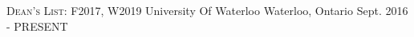 \begin{siderulesEdu}
\begin{cventries}
  \cventry
    {\scshape\color{black}{Candidate of B.ASc: Honours Mechanical Engineering 2021, Artificial Intelligence Option}\break\scshape{Dean's List: F2017, W2019}}
    {University Of Waterloo}
    {Waterloo, Ontario}
    {Sept. 2016 - PRESENT}
    {}
\end{cventries}
\end{siderulesEdu}
